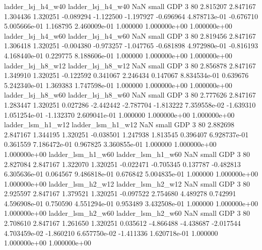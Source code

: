        ladder_lsj_h4_w40        ladder_lsj_h4_w40                   NaN      small      GDP                 3 80 2.815207       2.847167 1.304436       1.320251   -0.089294     -1.122500     -1.197927    -0.696964   4.878713e-01 -0.676710 5.005666e-01     1.168795   2.460009e-01            1.000000    1.000000e+00        1.000000e+00
       ladder_lsj_h4_w60        ladder_lsj_h4_w60                   NaN      small      GDP                 3 80 2.819456       2.847167 1.306418       1.320251   -0.004380     -0.973257     -1.047765    -0.681898   4.972980e-01 -0.816193 4.168440e-01     0.229775   8.188606e-01            1.000000    1.000000e+00        1.000000e+00
       ladder_lsj_h8_w12        ladder_lsj_h8_w12                   NaN      small      GDP                 3 80 2.856878       2.847167 1.349910       1.320251   -0.122592      0.341067      2.246434     0.147067   8.834534e-01  0.639676 5.242340e-01     1.369383   1.747598e-01            1.000000    1.000000e+00        1.000000e+00
       ladder_lsj_h8_w60        ladder_lsj_h8_w60                   NaN      small      GDP                 3 80 2.777626       2.847167 1.283447       1.320251    0.027286     -2.442442     -2.787704    -1.813222   7.359558e-02 -1.639310 1.051254e-01    -1.132370   2.609041e-01            1.000000    1.000000e+00        1.000000e+00
       ladder_lsm_h1_w12        ladder_lsm_h1_w12                   NaN      small      GDP                 3 80 2.882698       2.847167 1.344195       1.320251   -0.038501      1.247938      1.813545     0.396407   6.928737e-01  0.361559 7.186472e-01     0.967825   3.360855e-01            1.000000    1.000000e+00        1.000000e+00
       ladder_lsm_h1_w60        ladder_lsm_h1_w60                   NaN      small      GDP                 3 80 2.827084       2.847167 1.322070       1.320251   -0.022471     -0.705345      0.137787    -0.482813   6.305636e-01  0.064567 9.486818e-01     0.676842   5.004835e-01            1.000000    1.000000e+00        1.000000e+00
       ladder_lsm_h2_w12        ladder_lsm_h2_w12                   NaN      small      GDP                 3 80 2.925597       2.847167 1.379521       1.320251   -0.097522      2.754680      4.489278     0.742991   4.596908e-01  0.750590 4.551294e-01     0.953489   3.432508e-01            1.000000    1.000000e+00        1.000000e+00
       ladder_lsm_h2_w60        ladder_lsm_h2_w60                   NaN      small      GDP                 3 80 2.708610       2.847167 1.261650       1.320251    0.035612     -4.866488     -4.438687    -2.017544   4.703459e-02 -1.860210 6.657750e-02    -1.411336   1.620718e-01            1.000000    1.000000e+00        1.000000e+00
